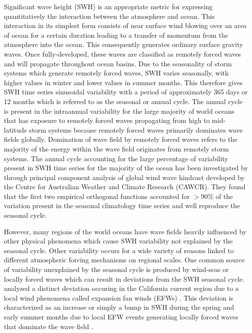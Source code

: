 \documentclass[12pt,twoside]{article}
\begin{document}
Significant wave height (SWH) is an appropriate metric for expressing quantitatively the interaction between the atmosphere and ocean. This interaction in its simplest form consists of near surface wind blowing over an area of ocean for a certain duration leading to a transfer of momentum from the atmosphere into the ocean. This consequently generates ordinary surface gravity waves. Once fully-developed, these waves are classified as remotely forced waves and will propagate throughout ocean basins. Due to the seasonality of storm systems which generate remotely forced waves, SWH varies seasonally, with higher values in winter and lower values in summer months. This therefore gives SWH time series sinusoidal variability with a period of approximately 365 days or 12 months which is referred to as the seasonal or annual cycle. The annual cycle is present in the intraannual variability for the large majority of world oceans that has exposure to remotely forced waves propagating from high to mid-latitude storm systems because remotely forced waves primarily dominates wave fields globally. Domination of wave field by remotely forced waves refers to the majority of the energy within the wave field originates from remotely storm systems. The annual cycle accounting for the large percentage of variability present in SWH time series for the majority of the ocean has been investigated by \citet{echevarria2019seasonal} through principal component analysis of global wind wave hindcast developed by the Centre for Australian Weather and Climate Research (CAWCR). They found that the first two empirical orthogonal functions accounted for $>90\%$ of the variation present in the seasonal climatology time series \cite{echevarria2019seasonal} and well reproduce the seasonal cycle. 


However, many regions of the world oceans have wave fields heavily influenced by other physical phenomena which cause SWH variability not explained by the seasonal cycle. Other variability occurs for a wide variety of reasons linked to different atmospheric forcing mechanisms on regional scales. One common source of variability unexplained by the seasonal cycle is produced by wind-seas or locally forced waves which can result in deviations from the SWH seasonal cycle. \citet{villas2017characterization} analyzed a distinct deviation occuring in the California current region due to a local wind phenomena called expansion fan winds (EFWs) \cite{winant1988marine}. This deviation is characterized as an increase or simply a bump in SWH during the spring and early summer months due to local EFW events generating locally forced waves that dominate the wave field \citep{villas2017characterization}.   
\end{document}

